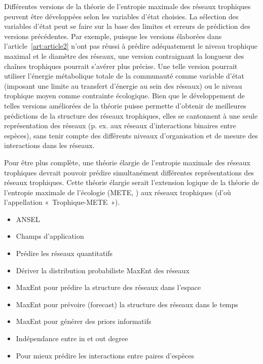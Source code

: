 Différentes versions de la théorie de l'entropie maximale des réseaux trophiques
peuvent être développées selon les variables d'état choisies. La sélection des
variables d'état peut se faire sur la base des limites et erreurs de prédiction
des versions précédentes. Par exemple, puisque les versions élaborées dans
l'article~\ref{art:article2} n'ont pas réussi à prédire adéquatement le niveau
trophique maximal et le diamètre des réseaux, une version contraignant la
longueur des chaînes trophiques pourrait s'avérer plus précise. Une telle
version pourrait utiliser l'énergie métabolique totale de la communauté comme
variable d'état (imposant une limite au transfert d'énergie au sein des réseaux)
ou le niveau trophique moyen comme contrainte écologique. Bien que le
développement de telles versions améliorées de la théorie puisse permette
d'obtenir de meilleures prédictions de la structure des réseaux trophiques,
elles se cantonnent à une seule représentation des réseaux (p. ex. aux réseaux
d'interactions binaires entre espèces), sans tenir compte des différents niveaux
d'organisation et de mesure des interactions dans les réseaux.

Pour être plus complète, une théorie élargie de l'entropie maximale des réseaux
trophiques devrait pouvoir prédire simultanément différentes représentations des
réseaux trophiques. Cette théorie élargie serait l'extension logique de la
théorie de l'entropie maximale de l'écologie (METE, \cite{Harte2011Maximum}) aux
réseaux trophiques (d'où l'appellation «~Trophique-METE~»).


\begin{itemize}
    \item ANSEL 
    \item Champs d'application 
    \item Prédire les réseaux quantitatifs
    \item Dériver la distribution probabiliste MaxEnt des réseaux
    \item MaxEnt pour prédire la structure des réseaux dans l'espace
    \item MaxEnt pour prévoire (forecast) la structure des réseaux dans le temps
    \item MaxEnt pour générer des priors informatifs 
    \item Indépendance entre in et out degree
    \item Pour mieux prédire les interactions entre paires d'espèces
\end{itemize}

